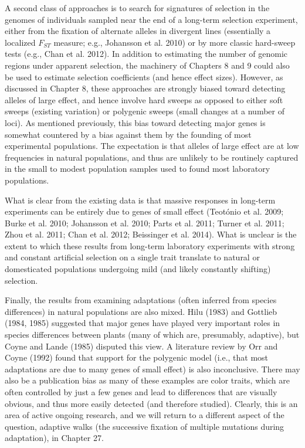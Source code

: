 \documentclass{article}
\begin{document}
A second class of approaches is to search for signatures of selection in the genomes of individuals sampled near the end of a long-term selection experiment, either from the fixation of alternate alleles in divergent lines (essentially a localized  $ F_{ST} $ measure; e.g., Johansson et al. 2010) or by more classic hard-sweep tests (e.g., Chan et al. 2012). In addition to estimating the number of genomic regions under apparent selection, the machinery of Chapters 8 and 9 could also be used to estimate selection coefficients (and hence effect sizes). However, as discussed in Chapter 8, these approaches are strongly biased toward detecting alleles of large effect, and hence involve hard sweeps as opposed to either soft sweeps (existing variation) or polygenic sweeps (small changes at a number of loci). As mentioned previously, this bias toward detecting major genes is somewhat countered by a bias against them by the founding of most experimental populations. The expectation is that alleles of large effect are at low frequencies in natural populations, and thus are unlikely to be routinely captured in the small to modest population samples used to found most laboratory populations.

What is clear from the existing data is that massive responses in long-term experiments can be entirely due to genes of small effect (Teotónio et al. 2009; Burke et al. 2010; Johansson et al. 2010; Parts et al. 2011; Turner et al. 2011; Zhou et al. 2011; Chan et al. 2012; Beissinger et al. 2014). What is unclear is the extent to which these results from long-term laboratory experiments with strong and constant artificial selection on a single trait translate to natural or domesticated populations undergoing mild (and likely constantly shifting) selection.

Finally, the results from examining adaptations (often inferred from species differences) in natural populations are also mixed. Hilu (1983) and Gottlieb (1984, 1985) suggested that major genes have played very important roles in species differences between plants (many of which are, presumably, adaptive), but Coyne and Lande (1985) disputed this view. A literature review by Orr and Coyne (1992) found that support for the polygenic model (i.e., that most adaptations are due to many genes of small effect) is also inconclusive. There may also be a publication bias as many of these examples are color traits, which are often controlled by just a few genes and lead to differences that are visually obvious, and thus more easily detected (and therefore studied). Clearly, this is an area of active ongoing research, and we will return to a different aspect of the question, adaptive walks (the successive fixation of multiple mutations during adaptation), in Chapter 27.
\end{document}
